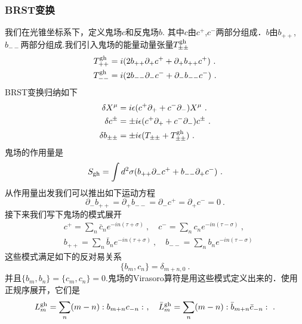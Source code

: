 \subsubsection{BRST变换}
我们在光锥坐标系下，定义鬼场$c$和反鬼场$b$. 其中$c$由$c^+$,$c^-$两部分组成．$b$由$b_{++}$,$b_{--}$两部分组成.我们引入鬼场的能量动量张量$T^{\rm gh}_{\pm\pm}$
\begin{equation}
\begin{aligned}
T^{\rm gh}_{++} &  = i (2 b_{++}\partial_+ c^+ +\partial_+ b_{++}c^+)~. \\
T^{\rm gh}_{--} &  = i (2 b_{--}\partial_- c^- +\partial_- b_{--}c^-)~.
\end{aligned}
\end{equation}
BRST变换归纳如下
\begin{equation}
\begin{aligned}
\delta X^\mu & = i \epsilon (c^+\partial_+ + c^- \partial_- ) X^\mu~. \\
\delta c^{\pm} & = \pm i \epsilon (c^+\partial_++c^-\partial_-) c^{\pm} ~. \\
\delta b_{\pm\pm} & = \pm i \epsilon (T_{\pm\pm} +T^{\rm gh}_{\pm\pm})~. 
\end{aligned}
\end{equation}
鬼场的作用量是
\begin{equation}
S_{\rm gh} = \int d^2\sigma (b_{++} \partial_- c^+ + b_{--} \partial_+ c^- ) ~.
\end{equation}
从作用量出发我们可以推出如下运动方程
\begin{equation}
\partial_- b_{++} = \partial_+ b_{--} = \partial_- c^+  = \partial_+ c^- = 0~.
\end{equation}
接下来我们写下鬼场的模式展开
\begin{equation}
\begin{aligned}
& c^+ = \sum_n \bar c_n e^{-i n (\tau+\sigma)} ~, \quad c^- = \sum_n c_n e^{-in(\tau-\sigma)} ~, \\
& b_{++} = \sum_n \bar b_n e^{-i n (\tau+\sigma)}~, \quad b_{--} = \sum_n b_n e^{-in(\tau-\sigma)}
\end{aligned}
\end{equation}
这些模式满足如下的反对易关系
\begin{equation}
\{b_m,c_n\} = \delta_{m+n,0}~.
\end{equation}
并且$\{b_m,b_n\}=\{c_m,c_n\}=0$.鬼场的Virasoro算符是用这些模式定义出来的．使用正规序展开，它们是
\begin{equation}
L_m^{\rm gh} = \sum_n (m-n):b_{m+n}c_{-n}:~, \quad \bar L_m^{\rm gh} = \sum_n (m-n) :\bar b_{m+n}\bar c_{-n}:~. 
\end{equation}
